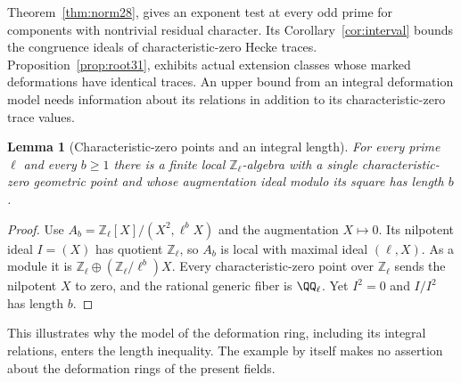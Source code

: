\documentclass[a4paper,11pt]{article}
\newtheorem{lemma}[proposition]{Lemma}
\theoremstyle{definition}
\theoremstyle{remark}
\newcommand{\ZZ}{\mathbb Z}\newcommand{\ord}{\operatorname{ord}}
\numberwithin{equation}{section}
\begin{document}
Theorem~\ref{thm:norm28}, gives an exponent test at every odd prime for components with nontrivial residual character. Its Corollary~\ref{cor:interval} bounds the congruence ideals of characteristic-zero Hecke traces. Proposition~\ref{prop:root31}, exhibits actual extension classes whose marked deformations have identical traces. An upper bound from an integral deformation model needs information about its relations in addition to its characteristic-zero trace values.

\begin{lemma}[Characteristic-zero points and an integral length]\label{lem:vertical23}
For every prime \(\ell\) and every \(b\ge1\) there is a finite local \(\ZZ_\ell\)-algebra with a single characteristic-zero geometric point and whose augmentation ideal modulo its square has length \(b\).
\end{lemma}
\begin{proof}
Use \(A_b=\ZZ_\ell[X]/(X^2,\ell^b X)\) and the augmentation \(X\mapsto0\). Its nilpotent ideal \(I=(X)\) has quotient \(\ZZ_\ell\), so \(A_b\) is local with maximal ideal \((\ell,X)\). As a module it is \(\ZZ_\ell\oplus(\ZZ_\ell/\ell^b)X\). Every characteristic-zero point over \(\ZZ_\ell\) sends the nilpotent \(X\) to zero, and the rational generic fiber is \(\QQ_\ell\). Yet \(I^2=0\) and \(I/I^2\) has length \(b\).
\end{proof}
This illustrates why the model of the deformation ring, including its integral relations, enters the length inequality. The example by itself makes no assertion about the deformation rings of the present fields.
\end{document}
